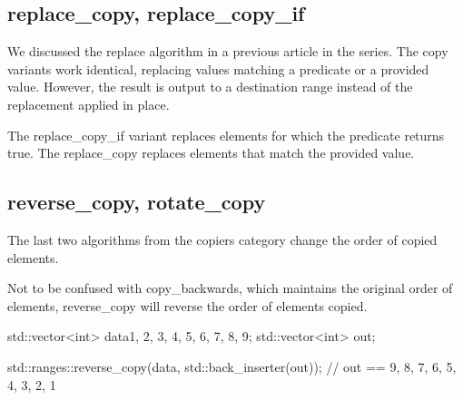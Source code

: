 \subsection{replace\_copy, replace\_copy\_if}

We discussed the replace algorithm in a previous article in the series. The copy variants work identical, replacing values matching a predicate or a provided value. However, the result is output to a destination range instead of the replacement applied in place.



The replace\_copy\_if variant replaces elements for which the predicate returns true. The replace\_copy replaces elements that match the provided value.

\begin{box-note}
\end{box-note}

\subsection{reverse\_copy, rotate\_copy}

The last two algorithms from the copiers category change the order of copied elements.



Not to be confused with copy\_backwards, which maintains the original order of elements, reverse\_copy will reverse the order of elements copied.

\begin{box-note}
\begin{cppcode}
std::vector<int> data{1, 2, 3, 4, 5, 6, 7, 8, 9};
std::vector<int> out;

std::ranges::reverse_copy(data, std::back_inserter(out));
// out == { 9, 8, 7, 6, 5, 4, 3, 2, 1 }
\end{cppcode}
\end{box-note}

